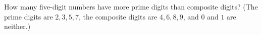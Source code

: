 How many five-digit numbers have more prime digits than composite digits? (The prime digits are $2,3,5,7$, the composite digits are $4,6,8,9$, and $0$ and $1$ are neither.)
